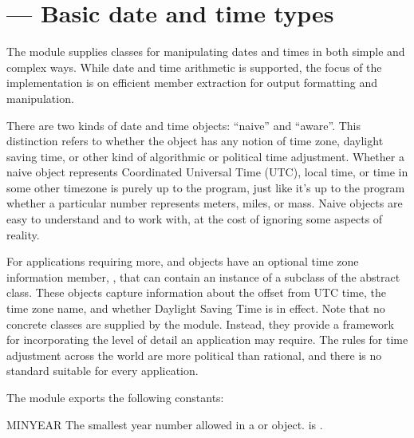 
\section{ ---
         Basic date and time types}




The  module supplies classes for manipulating dates
and times in both simple and complex ways.  While date and time
arithmetic is supported, the focus of the implementation is on
efficient member extraction for output formatting and manipulation.

There are two kinds of date and time objects: ``naive'' and ``aware''.
This distinction refers to whether the object has any notion of time
zone, daylight saving time, or other kind of algorithmic or political
time adjustment.  Whether a naive  object represents
Coordinated Universal Time (UTC), local time, or time in some other
timezone is purely up to the program, just like it's up to the program
whether a particular number represents meters, miles, or mass.  Naive
 objects are easy to understand and to work with, at
the cost of ignoring some aspects of reality.

For applications requiring more,  and 
objects have an optional time zone information member,
, that can contain an instance of a subclass of
the abstract  class.  These  objects
capture information about the offset from UTC time, the time zone
name, and whether Daylight Saving Time is in effect.  Note that no
concrete  classes are supplied by the 
module.  Instead, they provide a framework for incorporating the level
of detail an application may require.  The rules for time adjustment across
the world are more political than rational, and there is no standard
suitable for every application.

The  module exports the following constants:

\begin{datadesc}{MINYEAR}
  The smallest year number allowed in a  or
   object.  
  is .
\end{datadesc}


